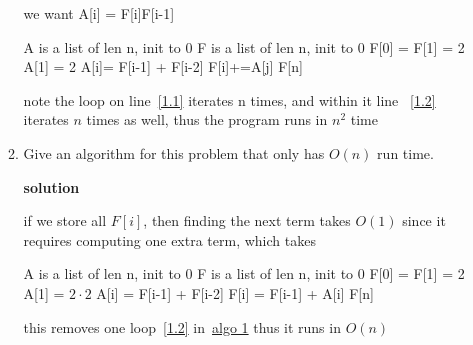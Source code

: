 \documentclass[letterpaper,12pt]{article}
\begin{document}
\begin{enumerate}
\begin{enumerate}
we want A[i] = F[i]F[i-1]

\begin{algorithmic}[1]\label{algo1.1}
    \State A is a list of len n, init to 0
    \State F is a list of len n, init to 0
    \State F[0] = F[1] = 2 
    \State A[1] = 2
    \label{1.1}
        \State A[i]= F[i-1] + F[i-2]
        \label{1.2}
            \State F[i]+=A[j]
        \EndFor
    \EndFor
    \State \Return F[n]
\end{algorithmic}

note the loop on line~\ref{1.1} iterates n times, and within it line ~\ref{1.2} iterates \(n\) times as well, thus the program runs in \(n^2\) time


\item
Give an algorithm for this problem that only has $O(n)$ 
run time. 

\textbf{solution}






if we store all \(F[i]\), then finding the next term takes \(O(1)\) since it requires computing one extra term, which takes 

\begin{algorithmic}[1]
    \State A is a list of len n, init to 0
    \State F is a list of len n, init to 0
    \State F[0] = F[1] = 2 
    \State A[1] = \(2\cdot 2\)
    \label{1.2.1}
        \State A[i] = F[i-1] + F[i-2]
        \State F[i] = F[i-1] + A[i]
    \EndFor
    \State \Return F[n]
\end{algorithmic}

this removes one loop~\ref{1.2} in~\hyperref[algo1.1]{algo 1} thus it runs in \(O(n)\)


\end{enumerate}




\end{enumerate}
\end{document}
